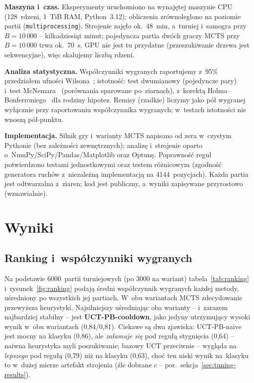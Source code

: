 \documentclass[12pt,a4paper]{article}
\begin{document}
\textbf{Maszyna i~czas.} Eksperymenty uruchomiono na wynajętej maszynie CPU (128~rdzeni, 1~TiB RAM,
Python~3.12); obliczenia zrównoleglono na poziomie partii (\texttt{multiprocessing}). Strojenie
zajęło ok.\ 48~min, a~turniej i~samogra przy $B=10\,000$ -- kilkadziesiąt minut; pojedyncza partia
dwóch graczy MCTS przy $B=10\,000$ trwa ok.\ 70~s. GPU nie jest tu przydatne (przeszukiwanie drzewa
jest sekwencyjne), więc skalujemy liczbą rdzeni.

\textbf{Analiza statystyczna.} Współczynniki wygranych raportujemy z~95\% przedziałem ufności
Wilsona~\cite{wilson1927probable}; istotność: test dwumianowy (pojedyncze pary) i~test
McNemara~\cite{mcnemar1947note} (porównania sparowane po~ziarnach), z~korektą
Holma--Bonferroniego~\cite{holm1979simple} dla rodziny hipotez. Remisy (rzadkie) liczymy jako pół
wygranej wyłącznie przy raportowaniu współczynnika wygranych; w~testach istotności nie wnoszą
pół-punktu.

\textbf{Implementacja.} Silnik gry i~warianty MCTS napisano od zera w~czystym Pythonie (bez
zależności zewnętrznych); analizę i~strojenie oparto o~NumPy/SciPy/Pandas/Matplotlib oraz Optunę.
Poprawność reguł potwierdzono testami jednostkowymi oraz testem różnicowym (zgodność generatora
ruchów z~niezależną implementacją na 4144~pozycjach). Każda
partia jest odtwarzalna z~ziaren; kod jest publiczny, a~wyniki zapisywane przyrostowo (wznawialnie).

\section{Wyniki}\label{sec:wyniki}

\subsection{Ranking i~współczynniki wygranych}
Na podstawie 6000~partii turniejowych (po 3000 na wariant) tabela~\ref{tab:ranking}
i~rysunek~\ref{fig:ranking} podają średni współczynnik wygranych każdej metody, uśredniony po
wszystkich jej partiach. W~obu wariantach MCTS zdecydowanie przewyższa heurystyki. Najsilniejszy
uśredniając oba warianty -- i~zarazem najbardziej stabilny -- jest \textbf{UCT-PB-cooldown}, jako
jedyny utrzymujący wysoki wynik w~obu wariantach (0,84/0,81). Ciekawe są dwa zjawiska: UCT-PB-naive jest mocny na klasyku (0,86), ale
\emph{załamuje się} pod regułą stygnięcia (0,64) -- naiwna heurystyka myli poszukiwanie; bazowy UCT
przeciwnie -- wygląda na \emph{lepszego} pod regułą (0,79) niż na klasyku (0,63), choć ten niski wynik
na~klasyku to w~dużej mierze artefakt strojenia (źle dobrane $c$ -- por.\ sekcja~\ref{sec:tuning-results}).
\end{document}
